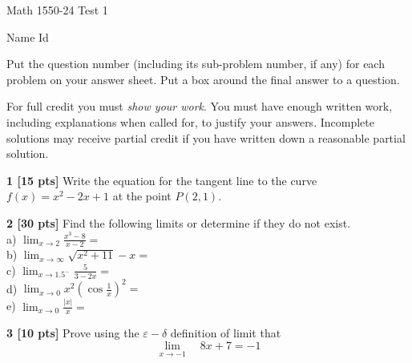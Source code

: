 \documentclass[12pt]{article}
\begin{document}
\begin{large}
\begin{bf}
\hspace{1.5in}
\parbox{2.0in}{Math 1550-24 \newline Test 1 }
\hspace{1in}
\parbox{1in}{ Name \newline Id}
\end{bf}
\end{large}

\vspace{0.2in}

Put the question number (including its sub-problem number, if any) for each 
problem on your answer sheet. 
Put a box around the final answer to a question.

\vspace*{.02in}
For full credit you must \emph{show your work}. You must have enough
written work, including explanations when called for, to justify your
answers. Incomplete solutions may receive partial credit if you have
written down a reasonable partial solution. %
                                         

\vspace{0.25in}
\noindent
{\bf 1 [15 pts]}  Write the equation for the tangent line
to the curve
$\displaystyle{f(x) = x^2-2x + 1}$ at the
point $\displaystyle{P(2,1)}$.


\vspace{.15in}
\noindent 
{\bf 2 [30 pts]}  Find the following limits or determine if they do not exist.
\\
a) $\displaystyle{\lim_{x\to 2}\frac{x^3-8}{x-2}=}$\\
b) $\displaystyle{\lim_{x\to \infty} \sqrt{x^2+11}-x =}$\\
c) $\displaystyle{\lim_{x\to 1.5^-}\frac{5}{3-2x}=}$\\
d) $\displaystyle{\lim_{x\to 0}x^2\left(\cos \frac{1}{x}\right)^2=}$
\\ 
e) $\displaystyle{\lim_{x\to 0}\frac{\vert x \vert}{x}=}$ 


\vspace{.15in}
\noindent
{\bf 3 [10 pts]} Prove using the $\varepsilon-\delta$ definition of limit
that
$$
\lim_{x\rightarrow -1}\quad 8x+7 =-1
$$
\end{document}
